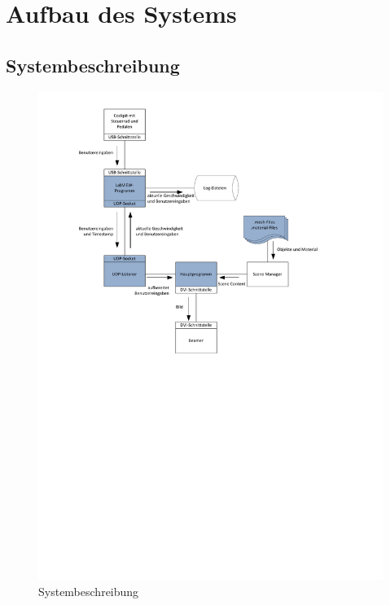 \section{Aufbau des Systems}
\subsection{Systembeschreibung}

\begin{figure}[H]
\centering 
\includegraphics{src/Systembeschreibung.pdf}
\caption{Systembeschreibung} %
\label{Systembeschreibung} %
\end{figure}



